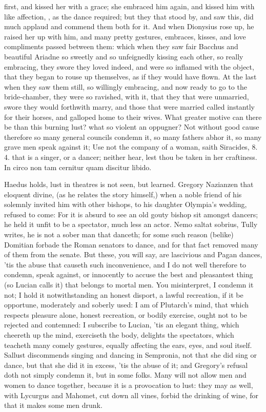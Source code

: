 first, and kissed her with a grace; she embraced him again, and kissed
him with like affection, \etc{}, as the dance required; but they that
stood by, and saw this, did much applaud and commend them both for it.
And when Dionysius rose up, he raised her up with him, and many pretty
gestures, embraces, kisses, and love compliments passed between them:
which when they saw fair Bacchus and beautiful Ariadne so sweetly and
so unfeignedly kissing each other, so really embracing, they swore they
loved indeed, and were so inflamed with the object, that they began to
rouse up themselves, as if they would have flown. At the last when they
saw them still, so willingly embracing, and now ready to go to the
bride-chamber, they were so ravished, with it, that they that were
unmarried, swore they would forthwith marry, and those that were
married called instantly for their horses, and galloped home to their
wives. What greater motive can there be than this burning lust? what so
violent an oppugner? Not without good cause therefore so many general
councils condemn it, so many fathers abhor it, so many grave men speak
against it; Use not the company of a woman, saith Siracides, 8. 4. that
is a singer, or a dancer; neither hear, lest thou be taken in her
craftiness. In circo non tam cernitur quam discitur libido.

Haedus holds, lust in theatres is not seen, but learned. Gregory
Nazianzen that eloquent divine, (as he relates the story
himself,) when a noble friend of his solemnly invited him with other
bishops, to his daughter Olympia's wedding, refused to come: For
it is absurd to see an old gouty bishop sit amongst dancers; he held it
unfit to be a spectator, much less an actor. Nemo saltat sobrius, Tully
writes, he is not a sober man that danceth; for some such reason
(belike) Domitian forbade the Roman senators to dance, and for that
fact removed many of them from the senate. But these, you will say, are
lascivious and Pagan dances, 'tis the abuse that causeth such
inconvenience, and I do not well therefore to condemn, speak against,
or innocently to accuse the best and pleasantest thing (so Lucian
calls it) that belongs to mortal men. You misinterpret, I condemn it
not; I hold it notwithstanding an honest disport, a lawful recreation,
if it be opportune, moderately and soberly used: I am of Plutarch's
mind, that which respects pleasure alone, honest recreation, or
bodily exercise, ought not to be rejected and contemned: I subscribe to
Lucian, 'tis an elegant thing, which cheereth up the mind,
exerciseth the body, delights the spectators, which teacheth many
comely gestures, equally affecting the ears, eyes, and soul itself.
Sallust discommends singing and dancing in Sempronia, not that she did
sing or dance, but that she did it in excess, 'tis the abuse of it; and
Gregory's refusal doth not simply condemn it, but in some folks. Many
will not allow men and women to dance together, because it is a
provocation to lust: they may as well, with Lycurgus and Mahomet, cut
down all vines, forbid the drinking of wine, for that it makes some men
drunk.

